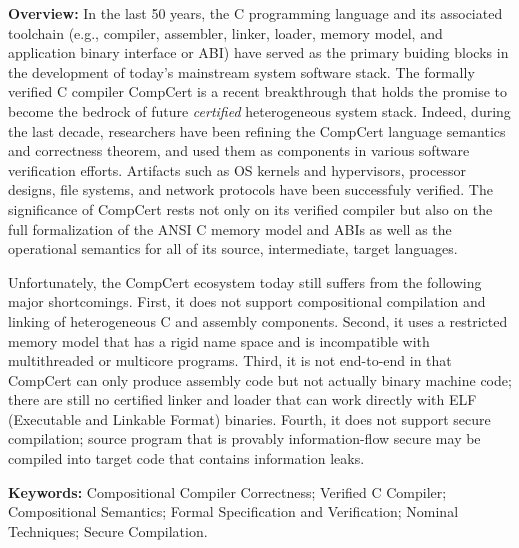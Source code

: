 
{\bf Overview:} In the last 50 years, the C programming language and
its associated toolchain (e.g., compiler, assembler, linker, loader,
memory model, and application binary interface or ABI) have served as
the primary buiding blocks in the development of today's mainstream
system software stack. The formally verified C compiler CompCert is a
recent breakthrough that holds the promise to become the bedrock of
future {\em certified} heterogeneous system stack.  Indeed,
during the last decade, researchers have been refining the CompCert
language semantics and correctness theorem, and used them as
components in various software verification efforts. Artifacts such as
OS kernels and hypervisors, processor designs, file systems, and
network protocols have been successfuly verified. The significance of
CompCert rests not only on its verified compiler but also on the full
formalization of the ANSI C memory model and ABIs as well as the
operational semantics for all of its source, intermediate, target
languages.

Unfortunately, the CompCert ecosystem today still suffers from the
following major shortcomings. First, it does not support compositional
compilation and linking of heterogeneous C and assembly components.
Second, it uses a restricted memory model that has a rigid name space
and is incompatible with multithreaded or multicore programs.  Third,
it is not end-to-end in that CompCert can only produce assembly code
but not actually binary machine code; there are still no certified
linker and loader that can work directly with ELF (Executable and
Linkable Format) binaries.  Fourth, it does not support secure
compilation; source program that is provably information-flow secure
may be compiled into target code that contains information leaks.

{\bf Keywords:} Compositional Compiler Correctness; Verified C Compiler;
Compositional Semantics; Formal Specification and Verification;
Nominal Techniques; Secure Compilation.

